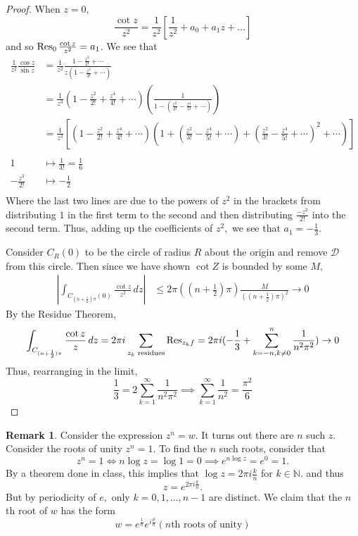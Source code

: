 \documentclass[10pt, oneside]{article}
\newcommand{\bbN}{\mathbb{N}}
\theoremstyle{definition}
\newtheorem{rem}{Remark}
\newcommand{\bbN}{\mathbb{N}}
\begin{document}
\begin{proof}
    When $z = 0,$ 
    \[\frac{\cot z}{z^2} = \frac{1}{z^2}\left[\frac{1}{z^2} + a_0 + a_1z + \dots\right]\] and so $\Res_0 \frac{\cot z}{z^2} = a_1$. We see that 
    \begin{align*}
        \frac{1}{z^2}\frac{\cos z}{\sin z} &= \frac{1}{z^2}\frac{1 - \frac{z^2}{2!} + \cdots}{z(1 - \frac{z^2}{3!} + \cdots)}\\
        &= \frac{1}{z^3}(1 - \frac{z^2}{2!} + \frac{z^4}{4!} + \cdots)\left(\frac{1}{1 - (\frac{z^2}{3!} - \frac{z^4}{5!}+\cdots)}\right) \\
        &= \frac{1}{z^3}\left[(1 - \frac{z^2}{2!} + \frac{z^4}{4!} + \cdots)(1 + (\frac{z^2}{3!} - \frac{z^4}{5!}+\cdots)+ (\frac{z^2}{3!} - \frac{z^4}{5!}+\cdots)^2 + \cdots)\right]\\
        \\
        1&\mapsto \frac{1}{3!} = \frac{1}{6}\\
        -\frac{z^2}{2!}&\mapsto -\frac{1}{2}\\
    \end{align*}
    Where the last two lines are due to the powers of $z^2$ in the brackets from distributing $1$ in the first term to the second and then distributing $\frac{-z^2}{2!}$ into the second term. Thus, adding up the coefficients of $z^2,$ we see that $a_1 = -\frac{1}{3}.$

    Consider $C_R(0)$ to be the circle of radius $R$ about the origin and remove $\mathcal{D}$ from this circle. Then since we have shown $\cot Z$ is bounded by some $M,$
    \begin{align*}
        |\int_{C_{(n + \frac{1}{2})\pi}(0)}\frac{\cot z}{z^2}\,dz| &\leq 2\pi ((n + \frac{1}{2})\pi) \frac{M}{((n + \frac{1}{2})\pi)^2} \to 0
    \end{align*}
    By the Residue Theorem, 
    \[\int_{C_{(n + \frac{1}{2})\pi}} \frac{\cot z}{z}\,dz = 2\pi i\sum_{\text{$z_k$ residues}}\Res_{z_k f} = 2\pi i (-\frac{1}{3} + \sum_{k=-n, k\neq 0}^n \frac{1}{n^2 \pi ^2}) \to 0\] Thus, rearranging in the limit,
    \[\frac{1}{3}= 2\sum_{k=1}^\infty \frac{1}{n^2 \pi^2} \implies \sum_{k=1}^\infty \frac{1}{n^2} = \frac{\pi^2}{6}\]
\end{proof}

\begin{rem}
    Consider the expression $z^n  = w.$ It turns out there are $n$ such $z.$ Consider the roots of unity $z^n = 1.$ To find the $n$ such roots, consider that 
    \[z^n =1 \iff n\log z = \log 1 = 0 \implies e^{n\log z} = e^0 = 1.\]By a theorem done in class, this implies that $\log z = 2\pi i \frac{k}{n}$ for $k \in \bbN.$ and thus 
    \[z = e^{2\pi i \frac{k}{n}}.\] But by periodicity of $e,$ only $k = 0, 1, \dots, n-1$ are distinct. We claim that the $n$th root of $w$ has the form 
    \[w = e^{\frac{1}{n}} e^{i\frac{\rho}{n}}(\text{$n$th roots of unity})\]
\end{rem}
\end{document}
